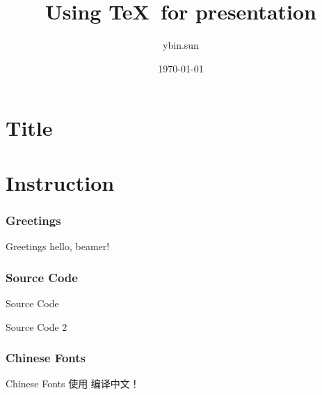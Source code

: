 ﻿\documentclass[xcolor=svgnames]{beamer}
\title{Using \TeX\ for presentation}
\author{ybin.sun}
\institute{\texttt{ybin.sun@gmail.com}}
\date{\today}
\begin{document}


\part[Title]{Title}
\begin{frame}[plain]
  \titlepage
\end{frame}


\part[Instruction]{Instruction}
\section[Greetings]{Greetings}
\begin{frame}{Greetings}
hello, beamer!
\end{frame}

\section[Source Code]{Source Code}
\begin{frame}{Source Code}

\end{frame}

\begin{frame}{Source Code 2}
  
\end{frame}


\section[Chinese Fonts]{Chinese Fonts}
\begin{frame}{Chinese Fonts}
使用 \XeTeX{} 编译中文！
\end{frame}
\end{document}
